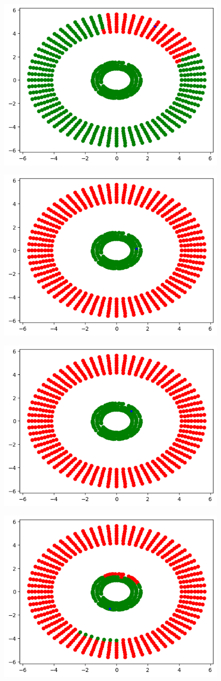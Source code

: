 \documentclass[a4paper,11pt]{article}
\begin{document}
\begin{mlsolution}
\begin{figure}[H]
	\label{fig:5.2.2.3}
\end{figure}
\begin{figure}[H]
	\centering
	\includegraphics[width=0.5\linewidth]{5.2.2.4.png}
	\label{fig:5.2.2.4}
\end{figure}
\begin{figure}[H]
	\centering
	\includegraphics[width=0.5\linewidth]{5.2.2.5.png}
	\label{fig:5.2.2.5}
\end{figure}
\begin{figure}[H]
	\centering
	\includegraphics[width=0.5\linewidth]{5.2.2.6.png}
	\label{fig:5.2.2.6}
\end{figure}
\begin{figure}[H]
	\centering
	\includegraphics[width=0.5\linewidth]{5.2.2.7.png}

\end{figure}
\end{mlsolution}
\end{document}
